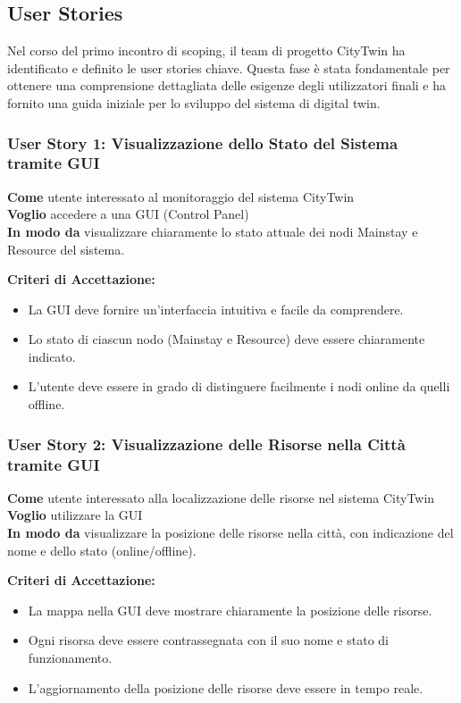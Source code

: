 \subsection{User Stories}

Nel corso del primo incontro di scoping, il team di progetto CityTwin ha identificato e definito le user stories chiave. Questa fase è stata fondamentale per ottenere una comprensione dettagliata delle esigenze degli utilizzatori finali e ha fornito una guida iniziale per lo sviluppo del sistema di digital twin.

\subsubsection{User Story 1: Visualizzazione dello Stato del Sistema tramite GUI}

\textbf{Come} utente interessato al monitoraggio del sistema CityTwin \\
\textbf{Voglio} accedere a una GUI (Control Panel) \\
\textbf{In modo da} visualizzare chiaramente lo stato attuale dei nodi Mainstay e Resource del sistema.

\textbf{Criteri di Accettazione:}
\begin{itemize}
  \item La GUI deve fornire un'interfaccia intuitiva e facile da comprendere.
  \item Lo stato di ciascun nodo (Mainstay e Resource) deve essere chiaramente indicato.
  \item L'utente deve essere in grado di distinguere facilmente i nodi online da quelli offline.
\end{itemize}

\subsubsection{User Story 2: Visualizzazione delle Risorse nella Città tramite GUI}

\textbf{Come} utente interessato alla localizzazione delle risorse nel sistema CityTwin \\
\textbf{Voglio} utilizzare la GUI \\
\textbf{In modo da} visualizzare la posizione delle risorse nella città, con indicazione del nome e dello stato (online/offline).

\textbf{Criteri di Accettazione:}
\begin{itemize}
  \item La mappa nella GUI deve mostrare chiaramente la posizione delle risorse.
  \item Ogni risorsa deve essere contrassegnata con il suo nome e stato di funzionamento.
  \item L'aggiornamento della posizione delle risorse deve essere in tempo reale.
\end{itemize}

